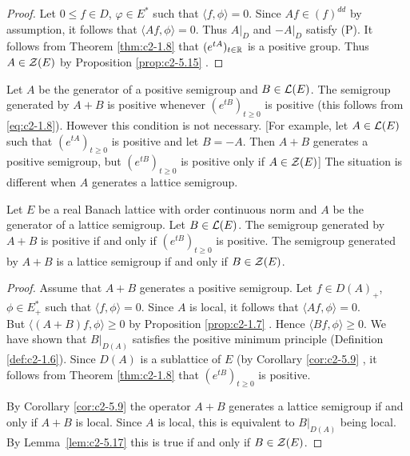 \begin{proof}
Let $0 \leq f \in D$, $\varphi \in E^*$ such that $\langle f,\phi \rangle = 0$.
Since $Af \in (f)^{dd}$ by assumption, it follows that $\langle Af,\phi \rangle = 0$.
Thus $A|_D$ and $-A|_D$ satisfy (P).
It follows from Theorem \ref{thm:c2-1.8}    that $(e^{tA})_{t \in \mathbb{R}}$ is a positive group.
Thus $A \in \mathcal{Z}(E)$ by  Proposition \ref{prop:c2-5.15}  .
\end{proof}

Let $A$ be the generator of a positive semigroup and $B \in \mathcal{L}(E)$. 
The semigroup generated by $A + B$ is positive whenever $(e^{tB})_{t \geq 0}$ is positive (this follows from \ref{eq:c2-1.8}).
However this condition is not
necessary. [For example, let $A \in \mathcal{L}(E)$ such that $(e^{tA})_{t \geq 0}$ is positive and let $B = -A$.
Then $A + B$ generates a positive semigroup, but $(e^{tB})_{t \geq 0}$ is positive only if $A \in \mathcal{Z}(E)$]
The situation is different when $A$ generates a lattice semigroup.

\begin{theorem}\label{thm:c2-5.18}
Let $E$ be a real Banach lattice with order continuous norm and $A$ be the generator of a lattice semigroup.
Let $B \in \mathcal{L}(E)$.
The semigroup generated by $A + B$ is positive if and only if $(e^{tB})_{t \geq 0}$ is positive.
The semigroup generated by $A + B$ is a lattice semigroup if and only if $B \in \mathcal{Z}(E)$.
\end{theorem}

\begin{proof}
Assume that $A + B$ generates a positive semigroup.
Let $f \in D(A)_{+}$, $\phi \in E_{+}^*$ such that $\langle f,\phi \rangle = 0$.
Since $A$ is local, it follows that $\langle Af,\phi \rangle = 0$.\\
But $\langle (A+B)f,\phi \rangle \geq 0$ by  Proposition  \ref{prop:c2-1.7}  .
Hence $\langle Bf,\phi \rangle \geq 0$.
We have shown that $B|_{D(A)}$ satisfies the positive minimum principle (Definition \ref{def:c2-1.6}).
Since $D(A)$ is a sublattice of $E$ (by Corollary \ref{cor:c2-5.9}  , it follows from Theorem \ref{thm:c2-1.8}   that $(e^{tB})_{t \geq 0}$ is positive.

By Corollary \ref{cor:c2-5.9} the operator $A + B$ generates a lattice semigroup if and only if $A + B$ is local.
Since $A$ is local, this is equivalent to $B|_{D(A)}$ being local.
By Lemma~\ref{lem:c2-5.17} this is true if and only if $B \in \mathcal{Z}(E)$.
\end{proof}

